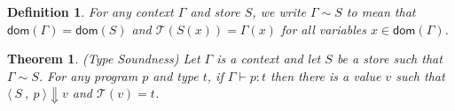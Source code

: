 \documentclass[10pt]{article}
\newcommand{\etyj}[3]{#1 \vdash #2 : #3}
\newcommand{\evj}[3]{\langle \ #1 \ , \ #2 \ \rangle \Downarrow #3}
\newcommand{\evjss}[4]{\langle \ #1 \ , \ #2 \ \rangle \longrightarrow \langle \ #3 \ , \ #4 \ \rangle}
\newcommand{\evjssm}[4]{\langle \ #1 \ , \ #2 \ \rangle \longrightarrow^\star \langle \ #3 \ , \ #4 \ \rangle}
\newtheorem*{theorem}{Theorem}
\newtheorem*{definition}{Definition}
\begin{document}
\begin{definition}
  For any context $\Gamma$ and store $S$, we write $\Gamma \sim S$ to mean that $\mathsf{dom}(\Gamma) = \mathsf{dom}(S)$ and  $\mathcal T(S(x)) = \Gamma(x)$ for all variables $x \in \mathsf{dom}(\Gamma)$.
\end{definition}




\begin{theorem}
  (Type Soundness)
  Let $\Gamma$ is a context and let $S$ be a store such that $\Gamma \sim S$.
  For any program $p$ and type $t$, if $\etyj \Gamma p t$ then there is a value $v$ such that $\evj S p v$ and $\mathcal T(v) = t$.
\end{theorem}
\end{document}
